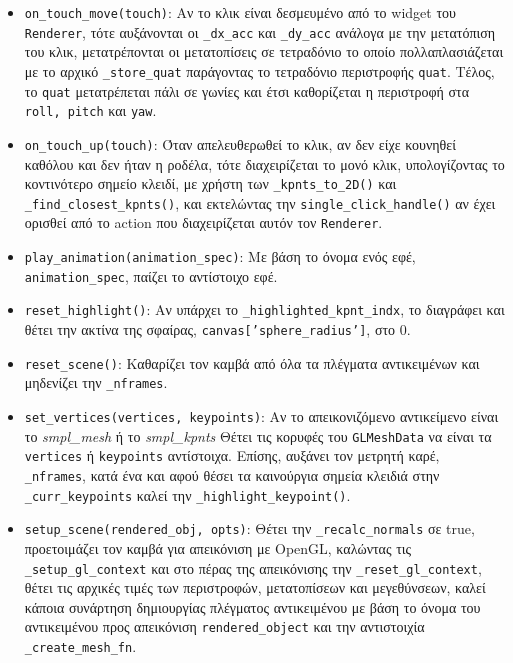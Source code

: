 \begin{itemize}
	\item \texttt{on\_touch\_move(touch)}: Αν το κλικ είναι δεσμευμένο από το widget του \texttt{Renderer}, τότε αυξάνονται οι \texttt{\_dx\_acc} και \texttt{\_dy\_acc} ανάλογα με την μετατόπιση του κλικ, μετατρέπονται οι μετατοπίσεις σε τετραδόνιο το οποίο πολλαπλασιάζεται με το αρχικό \texttt{\_store\_quat} παράγοντας το τετραδόνιο περιστροφής \texttt{quat}. Τέλος, το \texttt{quat} μετατρέπεται πάλι σε γωνίες και έτσι καθορίζεται η περιστροφή στα \texttt{roll, pitch} και \texttt{yaw}.
	
	\item \texttt{on\_touch\_up(touch)}: Όταν απελευθερωθεί το κλικ, αν δεν είχε κουνηθεί καθόλου και δεν ήταν η ροδέλα, τότε διαχειρίζεται το μονό κλικ, υπολογίζοντας το κοντινότερο σημείο κλειδί, με χρήστη των \texttt{\_kpnts\_to\_2D()} και \texttt{\_find\_closest\_kpnts()}, και εκτελώντας την \texttt{single\_click\_handle()} αν έχει ορισθεί από το action που διαχειρίζεται αυτόν τον \texttt{Renderer}.
	
	\item \texttt{play\_animation(animation\_spec)}: Με βάση το όνομα ενός εφέ, \texttt{animation\_spec}, παίζει το αντίστοιχο εφέ.
	
	\item \texttt{reset\_highlight()}: Αν υπάρχει το \texttt{\_highlighted\_kpnt\_indx}, το διαγράφει και θέτει την ακτίνα της σφαίρας, \texttt{canvas['sphere\_radius']}, στο 0.
	
	\item \texttt{reset\_scene()}: Καθαρίζει τον καμβά από όλα τα πλέγματα αντικειμένων και μηδενίζει την \texttt{\_nframes}.
	
	\item \texttt{set\_vertices(vertices, keypoints)}: Αν το απεικονιζόμενο αντικείμενο είναι το \textsl{smpl\_mesh} ή το \textsl{smpl\_kpnts} Θέτει τις κορυφές του \texttt{GLMeshData} να είναι τα \texttt{vertices} ή \texttt{keypoints} αντίστοιχα. Επίσης, αυξάνει τον μετρητή καρέ, \texttt{\_nframes}, κατά ένα και αφού θέσει τα καινούργια σημεία κλειδιά στην \texttt{\_curr\_keypoints} καλεί την \texttt{\_highlight\_keypoint()}.
	
	\item \texttt{setup\_scene(rendered\_obj, opts)}: Θέτει την \texttt{\_recalc\_normals} σε true, προετοιμάζει τον καμβά για απεικόνιση με OpenGL, καλώντας τις \texttt{\_setup\_gl\_context} και στο πέρας της απεικόνισης την \texttt{\_reset\_gl\_context}, θέτει τις αρχικές τιμές των περιστροφών, μετατοπίσεων και μεγεθύνσεων, καλεί κάποια συνάρτηση δημιουργίας πλέγματος αντικειμένου με βάση το όνομα του αντικειμένου προς απεικόνιση \texttt{rendered\_object} και την αντιστοιχία \texttt{\_create\_mesh\_fn}.
	
	
\end{itemize}
